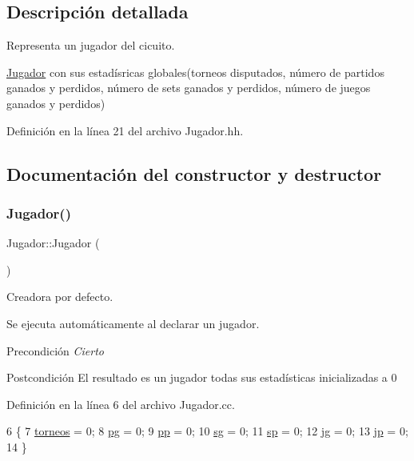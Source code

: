 \subsection{Descripción detallada}
Representa un jugador del cicuito. 

\hyperlink{class_jugador}{Jugador} con sus estadísricas globales(torneos disputados, número de partidos ganados y perdidos, número de sets ganados y perdidos, número de juegos ganados y perdidos) 

Definición en la línea 21 del archivo Jugador.\+hh.



\subsection{Documentación del constructor y destructor}
\mbox{\label{class_jugador_a232c46f75691af6210096e5972535d71}} 
\subsubsection{\texorpdfstring{Jugador()}{Jugador()}}
{\footnotesize\ttfamily Jugador\+::\+Jugador (\begin{DoxyParamCaption}{ }\end{DoxyParamCaption})}



Creadora por defecto. 

Se ejecuta automáticamente al declarar un jugador. \begin{DoxyPrecond}{Precondición}
{\itshape Cierto} 
\end{DoxyPrecond}
\begin{DoxyPostcond}{Postcondición}
El resultado es un jugador todas sus estadísticas inicializadas a 0 
\end{DoxyPostcond}


Definición en la línea 6 del archivo Jugador.\+cc.


\begin{DoxyCode}
6                 \{
7     \hyperlink{class_jugador_a2c4256c69ddf76e1c4f1e48f56ed305c}{torneos} = 0;
8     \hyperlink{class_jugador_ab254a72417747985ffaf53b0508e5e31}{pg} = 0;
9     \hyperlink{class_jugador_a90af14828909d3c5cd3fb4a285e96daf}{pp} = 0; 
10     \hyperlink{class_jugador_a678970fa93782e3e68f939c37fff5030}{sg} = 0; 
11     \hyperlink{class_jugador_a5bed10a21acb0c437828df282050b2ab}{sp} = 0; 
12     \hyperlink{class_jugador_a53ac73c3dc720ca6e66406b309077472}{jg} = 0; 
13     \hyperlink{class_jugador_a306eb04292a1aa300a39c2464c1368fd}{jp} = 0; 
14 \}
\end{DoxyCode}



